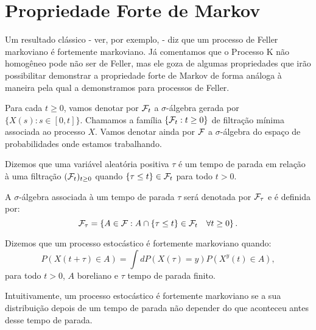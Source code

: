 
\section{Propriedade Forte de Markov}
\label{sec:prop-forte-markov}

Um resultado clássico - ver, por exemplo, \cite{fristedt:97} - diz que
um processo de Feller markoviano é fortemente markoviano. Já
comentamos que o Processo K não homogêneo pode não ser de Feller, mas
ele goza de algumas propriedades que irão possibilitar demonstrar a
propriedade forte de Markov de forma análoga à maneira pela qual a
demonstramos para processos de Feller.

Para cada $t \geq 0$, vamos denotar por ${\mathcal{F}}_t$ a $\sigma$-álgebra
gerada por $\{X(s): s \in [0, t]\}$. Chamamos a família $\{{\mathcal{F}}_t: t
\geq 0\}$ de filtração mínima associada ao processo $X$. Vamos denotar
ainda por ${\mathcal{F}}$ a $\sigma$-álgebra do espaço de probabilidades onde
estamos trabalhando.

\begin{definicao}
  Dizemos que uma variável aleatória positiva $\tau$ é um tempo de
  parada em relação à uma filtração $({\mathcal{F}}_t)_{t \geq 0}$ quando $\{
  \tau \leq t\} \in {\mathcal{F}}_t$ para todo $t > 0$.
\end{definicao}

\begin{definicao}
  A $\sigma$-álgebra associada à um tempo de parada $\tau$ será
  denotada por ${\mathcal{F}}_\tau$ e é definida por:
  \begin{displaymath}
    {\mathcal{F}}_\tau = \left\{
      A \in {\mathcal{F}}:  A \cap \{\tau \leq t\} \in {\mathcal{F}}_t \quad \forall t \geq 0 
    \right\}.
  \end{displaymath}
\end{definicao}

\begin{definicao}
  Dizemos que um processo estocástico é fortemente markoviano quando:
  \begin{displaymath}
    P\left( X(t + \tau) \in A \right) = 
    \int dP(X(\tau) = y)  P(X^y(t) \in A ),
  \end{displaymath}
  para todo $t > 0$, $A$ boreliano e $\tau$ tempo de parada \qc
  finito. 
\end{definicao}

Intuitivamente, um processo estocástico é fortemente markoviano se a
sua distribuição depois de um tempo de parada não depender do que
aconteceu antes desse tempo de parada.

